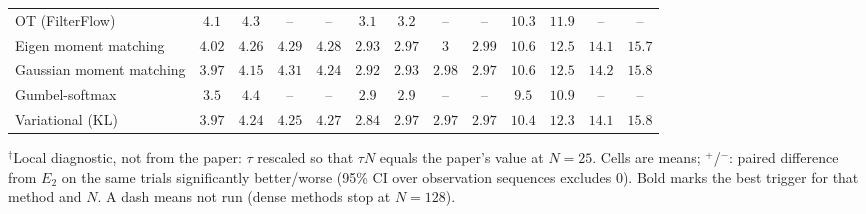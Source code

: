 \begin{table}[ht]
\begin{adjustbox}{max width=\linewidth}
\begin{tabular}{lcccc|cccc|cccc}
OT (FilterFlow) & $4.1$ & $4.3$ & -- & -- & $3.1$ & $3.2$ & -- & -- & $10.3$ & $11.9$ & -- & -- \\
Eigen moment matching & $4.02$ & $4.26$ & $4.29$ & $4.28$ & $2.93$ & $2.97$ & $3$ & $2.99$ & $10.6$ & $12.5$ & $14.1$ & $15.7$ \\
Gaussian moment matching & $3.97$ & $4.15$ & $4.31$ & $4.24$ & $2.92$ & $2.93$ & $2.98$ & $2.97$ & $10.6$ & $12.5$ & $14.2$ & $15.8$ \\
Gumbel-softmax & $3.5$ & $4.4$ & -- & -- & $2.9$ & $2.9$ & -- & -- & $9.5$ & $10.9$ & -- & -- \\
Variational (KL) & $3.97$ & $4.24$ & $4.25$ & $4.27$ & $2.84$ & $2.97$ & $2.97$ & $2.97$ & $10.4$ & $12.3$ & $14.1$ & $15.8$ \\
\bottomrule
\end{tabular}
\end{adjustbox}
\par\smallskip\parbox{0.95\linewidth}{\footnotesize $^\dagger$Local diagnostic, not from the paper: $\tau$ rescaled so that $\tau N$ equals the paper's value at $N{=}25$. Cells are means; $^{+}$/$^{-}$: paired difference from $E_2$ on the same trials significantly better/worse (95\% CI over observation sequences excludes 0). Bold marks the best trigger for that method and $N$. A dash means not run (dense methods stop at $N{=}128$).}
\end{table}

